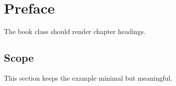 \documentclass{book}
\begin{document}
\chapter{Preface}
The book class should render chapter headings.

\section{Scope}
This section keeps the example minimal but meaningful.
\end{document}
